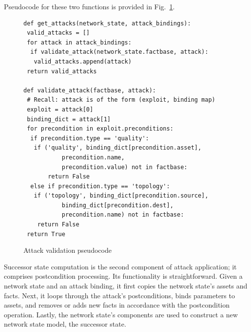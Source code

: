 Pseudocode for these two functions is provided in Fig.~\ref{fig:get_attacks_pc}.

\begin{figure}
\begin{lstlisting}
def get_attacks(network_state, attack_bindings):
 valid_attacks = []
 for attack in attack_bindings:
  if validate_attack(network_state.factbase, attack):
   valid_attacks.append(attack)
 return valid_attacks

def validate_attack(factbase, attack):
 # Recall: attack is of the form (exploit, binding map)
 exploit = attack[0]
 binding_dict = attack[1]
 for precondition in exploit.preconditions:
  if precondition.type == 'quality':
   if ('quality', binding_dict[precondition.asset], 
           precondition.name, 
           precondition.value) not in factbase:
       return False
  else if precondition.type == 'topology':
   if ('topology', binding_dict[precondition.source], 
           binding_dict[precondition.dest],
           precondition.name) not in factbase:
    return False
 return True
\end{lstlisting}
\caption{Attack validation pseudocode}
\label{fig:get_attacks_pc}
\end{figure}
Successor state computation is the second component of attack application;
it comprises postcondition processing. Its functionality is straightforward.
Given a network state and an attack binding, it first copies the network state's
assets and facts. Next, it loops through the attack's
postconditions, binds parameters to assets, and removes or adds new facts
in accordance with the postcondition operation. Lastly, the network state's
components are used to construct a new network state model, the successor
state.


